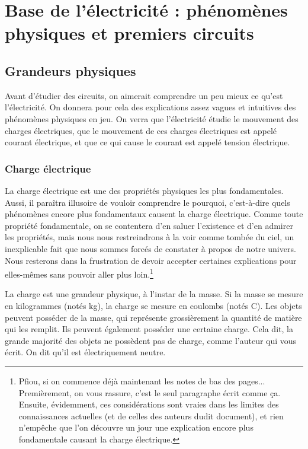 \documentclass{article}
\begin{document}
\newpage
\tableofcontents
\newpage

\setlength{\parskip}{1ex}
\section{Base de l'électricité : phénomènes physiques et premiers circuits}

\subsection{Grandeurs physiques}

Avant d'étudier des circuits, on aimerait comprendre un peu mieux ce qu'est l'électricité. On donnera pour cela des explications assez vagues et intuitives des phénomènes physiques en jeu. On verra que l'électricité étudie le mouvement des charges électriques, que le mouvement de ces charges électriques est appelé courant électrique, et que ce qui cause le courant est appelé tension électrique.

\subsubsection{Charge électrique}

La charge électrique est une des propriétés physiques les plus fondamentales. Aussi, il paraîtra illusoire de vouloir comprendre le pourquoi, c'est-à-dire quels phénomènes encore plus fondamentaux causent la charge électrique. Comme toute propriété fondamentale, on se contentera d'en saluer l'existence et d'en admirer les propriétés, mais nous nous restreindrons à la voir comme tombée du ciel, un inexplicable fait que nous sommes forcés de constater à propos de notre univers. Nous resterons dans la frustration de devoir accepter certaines explications pour elles-mêmes sans pouvoir aller plus loin.\footnote{Pfiou, si on commence déjà maintenant les notes de bas des pages... Premièrement, on vous rassure, c'est le seul paragraphe écrit comme ça. Ensuite, évidemment, ces considérations sont vraies dans les limites des connaissances actuelles (et de celles des auteurs dudit document), et rien n'empêche que l'on découvre un jour une explication encore plus fondamentale causant la charge électrique.}

La charge est une grandeur physique, à l'instar de la masse. Si la masse se mesure en kilogrammes (notés \si{\kilo\gram}), la charge se mesure en coulombs (notés \si{\coulomb}). Les objets peuvent posséder de la masse, qui représente grossièrement la quantité de matière qui les remplit. Ils peuvent également posséder une certaine charge. Cela dit, la grande majorité des objets ne possèdent pas de charge, comme l'auteur qui vous écrit. On dit qu'il est électriquement neutre.
\end{document}
